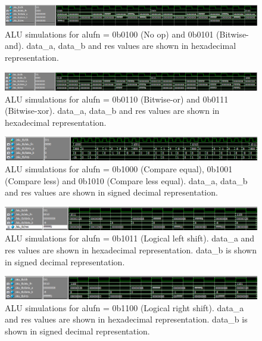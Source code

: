 \begin{figure}[H]
    \centering
    \includegraphics[width=\linewidth]{Chapter3-CPU/res/alu_simu_1_0.PNG}
    \caption{ALU simulations for alufn = 0b0100 (No op) and 0b0101 (Bitwise-and). data\_a, data\_b and
    res values are shown in hexadecimal representation.}
    \label{fig:sim/alu_1}
\end{figure}

\begin{figure}[H]
    \centering
    \includegraphics[width=\linewidth]{Chapter3-CPU/res/alu_simu_1_1.PNG}
    \caption{ALU simulations for alufn = 0b0110 (Bitwise-or) and 0b0111 (Bitwise-xor). data\_a, data\_b and
    res values are shown in hexadecimal representation.}
    \label{fig:sim/alu_2}
\end{figure}

\begin{figure}[H]
    \centering
    \includegraphics[width=\linewidth]{Chapter3-CPU/res/alu_simu_2.PNG}
    \caption{ALU simulations for alufn = 0b1000 (Compare equal), 0b1001 (Compare less) and
    0b1010 (Compare less equal). data\_a, data\_b and res values are shown in signed decimal 
    representation.}
    \label{fig:sim/alu_3}
\end{figure}

\begin{figure}[H]
    \centering
    \includegraphics[width=\linewidth]{Chapter3-CPU/res/alu_simu_3_0.PNG}
    \caption{ALU simulations for alufn = 0b1011 (Logical left shift). data\_a and
    res values are shown in hexadecimal representation. data\_b is shown in signed decimal 
    representation.}
    \label{fig:sim/alu_4}
\end{figure}

\begin{figure}[H]
    \centering
    \includegraphics[width=\linewidth]{Chapter3-CPU/res/alu_simu_3_1.PNG}
    \caption{ALU simulations for alufn = 0b1100 (Logical right shift). data\_a and
    res values are shown in hexadecimal representation. data\_b is shown in signed decimal 
    representation.}
    \label{fig:sim/alu_5}
\end{figure}

